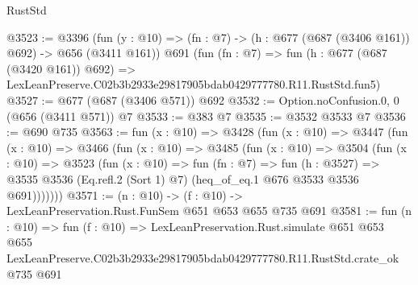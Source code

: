 \begin{lexlean}{RustStd}
\begin{coremodule}
@3523 := @3396
    (fun (y : @10) => (fn : @7) -> (h : @677 (@687 (@3406 @161)) @692) -> @656 (@3411 @161))
    @691
    (fun (fn : @7) =>
    fun (h : @677 (@687 (@3420 @161)) @692) =>
    LexLeanPreserve.C02b3b2933e29817905bdab0429777780.R11.RustStd.fun5)
@3527 := @677 (@687 (@3406 @571)) @692
@3532 := Option.noConfusion.{0, 0} (@656 (@3411 @571)) @7
@3533 := @383 @7
@3535 := @3532 @3533 @7
@3536 := @690 @735
@3563 := fun (x : @10) =>
  @3428
    (fun (x : @10) =>
    @3447
      (fun (x : @10) =>
      @3466
        (fun (x : @10) =>
        @3485
          (fun (x : @10) =>
          @3504
            (fun (x : @10) =>
            @3523
              (fun (x : @10) =>
              fun (fn : @7) =>
              fun (h : @3527) =>
              @3535 @3536 (Eq.refl.{2} (Sort 1) @7) (heq_of_eq.{1} @676 @3533 @3536 @691)))))))
@3571 := (n : @10) -> (f : @10) -> LexLeanPreservation.Rust.FunSem @651 @653 @655 @735 @691
@3581 := fun (n : @10) =>
  fun (f : @10) =>
  LexLeanPreservation.Rust.simulate
    @651
    @653
    @655
    LexLeanPreserve.C02b3b2933e29817905bdab0429777780.R11.RustStd.crate_ok
    @735
    @691
\end{coremodule}
\end{lexlean}
